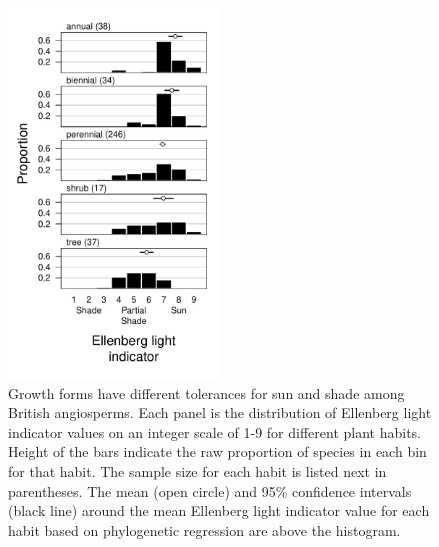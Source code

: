 \documentclass[12pt, oneside]{article}
\begin{document}
\begin{figure}[ht]
\centerline{\includegraphics[width=0.5\textwidth]{figures/figure_hf-light.pdf}}
\caption{Growth forms have different tolerances for sun and shade among British angiosperms. Each panel is the distribution of Ellenberg light indicator values on an integer scale of 1-9 for different plant habits. Height of the bars indicate the raw proportion of species in each bin for that habit. The sample size for each habit is listed next in parentheses. The mean (open circle) and 95\% confidence intervals (black line) around the mean Ellenberg light indicator value for each habit based on phylogenetic regression are above the histogram.} 
\label{fig:hf-light}
\end{figure}
\end{document}
